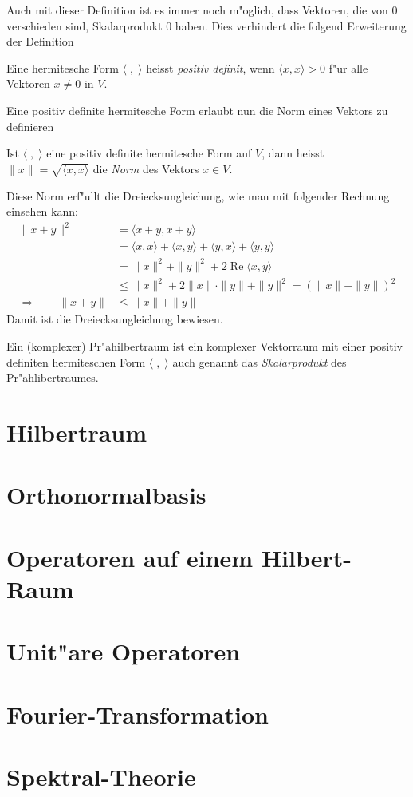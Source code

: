 Auch mit dieser Definition ist es immer noch m"oglich, dass Vektoren,
die von $0$ verschieden sind, Skalarprodukt $0$ haben.
Dies verhindert die folgend Erweiterung der Definition

\begin{definition}
\label{hilbert:postivdefiniteform}
Eine hermitesche Form $\langle\;,\;\rangle$ heisst {\em positiv definit},
wenn $\langle x,x\rangle > 0$ f"ur alle Vektoren $x\ne 0$ in $V$.
\end{definition}

Eine positiv definite hermitesche Form erlaubt nun die Norm
eines Vektors zu definieren

\begin{definition}
Ist $\langle \;,\;\rangle$ eine positiv definite hermitesche Form
auf $V$, dann heisst $\|x\| = \sqrt{\langle x,x\rangle}$ die {\em Norm}
des Vektors $x\in V$.
\end{definition}

Diese Norm erf"ullt die Dreiecksungleichung, wie man mit folgender
Rechnung einsehen kann:
\begin{align*}
\|x+y\|^2
&=
\langle x+y,x+y\rangle
\\
&=
\langle x,x\rangle
+
\langle x,y\rangle
+
\langle y,x\rangle
+
\langle y,y\rangle
\\
&=
\|x\|^2 + \|y\|^2
+ 2\operatorname{Re}\langle x,y\rangle
\\
&\le
\|x\|^2 + 2\|x\|\cdot \|y\| + \|y\|^2 = (\|x\| + \|y\|)^2
\\
\Rightarrow\qquad
\|x+y\|
&\le
\|x\| + \|y\|
\end{align*}
Damit ist die Dreiecksungleichung bewiesen.

\begin{definition}
Ein (komplexer) Pr"ahilbertraum ist ein komplexer Vektorraum mit
einer positiv definiten hermiteschen Form $\langle\;,\;\rangle$
auch genannt das {\em Skalarprodukt} des Pr"ahlibertraumes.
\end{definition}

\section{Hilbertraum}

\section{Orthonormalbasis}

\section{Operatoren auf einem Hilbert-Raum}

\section{Unit"are Operatoren}

\section{Fourier-Transformation}

\section{Spektral-Theorie}




